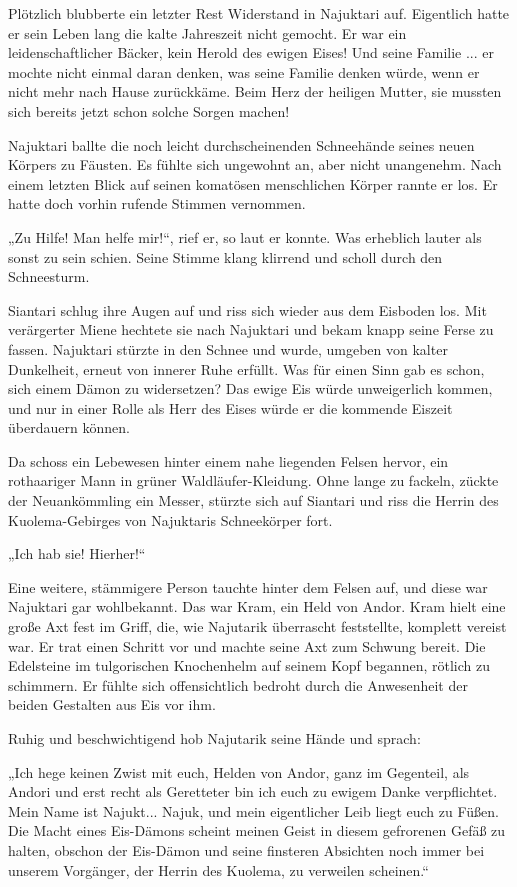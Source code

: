 \documentclass[10pt, a4paper, oneside]{book}
\begin{document}
Plötzlich blubberte ein letzter Rest Widerstand in Najuktari auf. Eigentlich hatte er sein Leben lang die kalte Jahreszeit nicht gemocht. Er war ein leidenschaftlicher Bäcker, kein Herold des ewigen Eises! Und seine Familie ... er mochte nicht einmal daran denken, was seine Familie denken würde, wenn er nicht mehr nach Hause zurückkäme. Beim Herz der heiligen Mutter, sie mussten sich bereits jetzt schon solche Sorgen machen!

Najuktari ballte die noch leicht durchscheinenden Schneehände seines neuen Körpers zu Fäusten. Es fühlte sich ungewohnt an, aber nicht unangenehm. Nach einem letzten Blick auf seinen komatösen menschlichen Körper rannte er los. Er hatte doch vorhin rufende Stimmen vernommen.

„Zu Hilfe! Man helfe mir!“, rief er, so laut er konnte. Was erheblich lauter als sonst zu sein schien. Seine Stimme klang klirrend und scholl durch den Schneesturm.

Siantari schlug ihre Augen auf und riss sich wieder aus dem Eisboden los. Mit verärgerter Miene hechtete sie nach Najuktari und bekam knapp seine Ferse zu fassen. Najuktari stürzte in den Schnee und wurde, umgeben von kalter Dunkelheit, erneut von innerer Ruhe erfüllt. Was für einen Sinn gab es schon, sich einem Dämon zu widersetzen? Das ewige Eis würde unweigerlich kommen, und nur in einer Rolle als Herr des Eises würde er die kommende Eiszeit überdauern können.

Da schoss ein Lebewesen hinter einem nahe liegenden Felsen hervor, ein rothaariger Mann in grüner Waldläufer-Kleidung. Ohne lange zu fackeln, zückte der Neuankömmling ein Messer, stürzte sich auf Siantari und riss die Herrin des Kuolema-Gebirges von Najuktaris Schneekörper fort.

„Ich hab sie! Hierher!“

Eine weitere, stämmigere Person tauchte hinter dem Felsen auf, und diese war Najuktari gar wohlbekannt. Das war Kram, ein Held von Andor. Kram hielt eine große Axt fest im Griff, die, wie Najutarik überrascht feststellte, komplett vereist war. Er trat einen Schritt vor und machte seine Axt zum Schwung bereit. Die Edelsteine im tulgorischen Knochenhelm auf seinem Kopf begannen, rötlich zu schimmern. Er fühlte sich offensichtlich bedroht durch die Anwesenheit der beiden Gestalten aus Eis vor ihm.

Ruhig und beschwichtigend hob Najutarik seine Hände und sprach: 

„Ich hege keinen Zwist mit euch, Helden von Andor, ganz im Gegenteil, als Andori und erst recht als Geretteter bin ich euch zu ewigem Danke verpflichtet. Mein Name ist Najukt... Najuk, und mein eigentlicher Leib liegt euch zu Füßen. Die Macht eines Eis-Dämons scheint meinen Geist in diesem gefrorenen Gefäß zu halten, obschon der Eis-Dämon und seine finsteren Absichten noch immer bei unserem Vorgänger, der Herrin des Kuolema, zu verweilen scheinen.“
\end{document}
